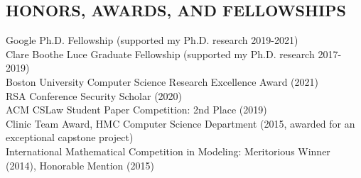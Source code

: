 \documentclass{res}
\begin{document}
\begin{resume}
\section{HONORS, AWARDS, AND FELLOWSHIPS}
\vspace{0.1in}
    Google Ph.D. Fellowship (supported my Ph.D. research 2019-2021) \\
    Clare Boothe Luce Graduate Fellowship (supported my Ph.D. research 2017-2019) \\
    Boston University Computer Science Research Excellence Award (2021) \\
    RSA Conference Security Scholar (2020) \\
    ACM CSLaw Student Paper Competition: 2nd Place (2019) \\
    Clinic Team Award, HMC Computer Science Department (2015, awarded for an exceptional capstone project) \\
    International Mathematical Competition in Modeling: Meritorious Winner (2014), Honorable Mention (2015) \\       


\end{resume}
\end{document}
